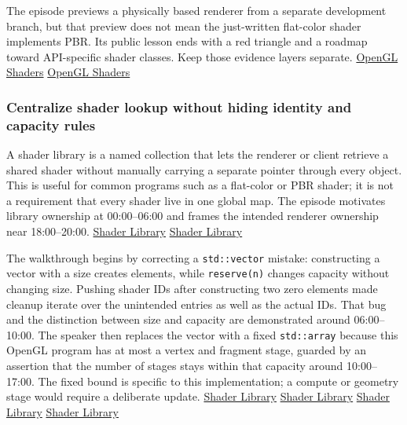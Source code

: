 The episode previews a physically based renderer from a separate development branch, but that preview does not mean the just-written flat-color shader implements PBR. Its public lesson ends with a red triangle and a roadmap toward API-specific shader classes. Keep those evidence layers separate. \href{https://www.youtube.com/watch?v=QBCCHm_9HV8&t=0s}{OpenGL Shaders} \href{https://www.youtube.com/watch?v=QBCCHm_9HV8&t=2460s}{OpenGL Shaders}

\subsubsection{Centralize shader lookup without hiding identity and capacity rules}\label{centralize-shader-lookup-without-hiding-identity-and-capacity-rules}

A shader library is a named collection that lets the renderer or client retrieve a shared shader without manually carrying a separate pointer through every object. This is useful for common programs such as a flat-color or PBR shader; it is not a requirement that every shader live in one global map. The episode motivates library ownership at 00:00--06:00 and frames the intended renderer ownership near 18:00--20:00. \href{https://www.youtube.com/watch?v=Z9LE3ksHEQQ&t=0s}{Shader Library} \href{https://www.youtube.com/watch?v=Z9LE3ksHEQQ&t=1080s}{Shader Library}

The walkthrough begins by correcting a \texttt{std::vector} mistake: constructing a vector with a size creates elements, while \texttt{reserve(n)} changes capacity without changing size. Pushing shader IDs after constructing two zero elements made cleanup iterate over the unintended entries as well as the actual IDs. That bug and the distinction between size and capacity are demonstrated around 06:00--10:00. The speaker then replaces the vector with a fixed \texttt{std::array} because this OpenGL program has at most a vertex and fragment stage, guarded by an assertion that the number of stages stays within that capacity around 10:00--17:00. The fixed bound is specific to this implementation; a compute or geometry stage would require a deliberate update. \href{https://www.youtube.com/watch?v=Z9LE3ksHEQQ&t=360s}{Shader Library} \href{https://www.youtube.com/watch?v=Z9LE3ksHEQQ&t=540s}{Shader Library} \href{https://www.youtube.com/watch?v=Z9LE3ksHEQQ&t=660s}{Shader Library} \href{https://www.youtube.com/watch?v=Z9LE3ksHEQQ&t=900s}{Shader Library}

